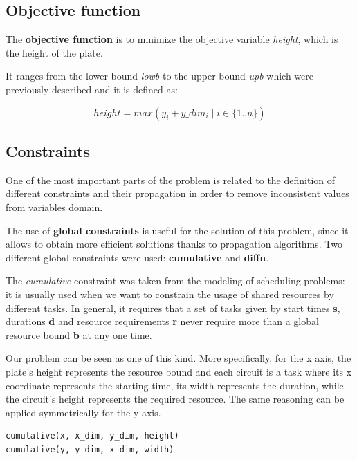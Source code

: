 \hfill

\subsection{Objective function}

The \textbf {objective function} is to minimize the objective variable \textit{height}, which is the height of the plate. 

It ranges from the lower bound \textit{lowb} to the upper bound \textit{upb} which were previously described and it is defined as:

\begin{equation*}
    height = max(y_i + y\_dim_i \; | \; i \in \{1..n\} )
\end{equation*}

\subsection{Constraints}

One of the most important parts of the problem is related to the definition of different constraints and their propagation in order to remove inconsistent values from variables domain.

The use of \textbf{global constraints} is useful for the solution of this problem, since it allows to obtain more efficient solutions thanks to propagation algorithms. Two different global constraints were used: \textbf {cumulative} and \textbf {diffn}. 

The \textit{cumulative} constraint was taken from the modeling of scheduling problems: it is usually used when we want to constrain the usage of shared resources by different tasks. In general, it requires that a set of tasks given by start times \textbf{s}, durations \textbf{d} and resource requirements \textbf{r} never require more than a global resource bound \textbf{b} at any one time. 

Our problem can be seen as one of this kind. More specifically, for the x axis, the plate’s height represents the resource
bound and each circuit is a task where its x coordinate represents the starting time, its width represents the duration, while the circuit's height represents the required
resource. The same reasoning can be applied symmetrically for the y axis.

\begin{verbatim}
cumulative(x, x_dim, y_dim, height)
cumulative(y, y_dim, x_dim, width)
\end{verbatim}

